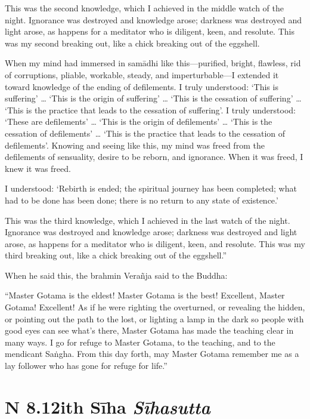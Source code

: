\documentclass[12pt,openany]{book}%
\newcommand*{\suttatitleacronym}[1]{\smaller[2]{#1}\vspace*{.3em}}
\newcommand*{\suttatitletranslation}[1]{\linebreak{#1}}
\newcommand*{\suttatitleroot}[1]{\linebreak\smaller[2]\itshape{#1}}
\newcommand*{\tocacronym}[1]{\hspace*{-3.3em}{#1}\quad}
\newcommand*{\toctranslation}[1]{#1}
\newcommand*{\tocroot}[1]{(\textit{#1})}
\begin{document}
This was the second knowledge, which I achieved in the middle watch of the night. Ignorance was destroyed and knowledge arose; darkness was destroyed and light arose, as happens for a meditator who is diligent, keen, and resolute. This was my second breaking out, like a chick breaking out of the eggshell. 

When my mind had immersed in \textsanskrit{samādhi} like this—purified, bright, flawless, rid of corruptions, pliable, workable, steady, and imperturbable—I extended it toward knowledge of the ending of defilements. I truly understood: ‘This is suffering’ … ‘This is the origin of suffering’ … ‘This is the cessation of suffering’ … ‘This is the practice that leads to the cessation of suffering’. I truly understood: ‘These are defilements’ … ‘This is the origin of defilements’ … ‘This is the cessation of defilements’ … ‘This is the practice that leads to the cessation of defilements’. Knowing and seeing like this, my mind was freed from the defilements of sensuality, desire to be reborn, and ignorance. When it was freed, I knew it was freed. 

I understood: ‘Rebirth is ended; the spiritual journey has been completed; what had to be done has been done; there is no return to any state of existence.’ 

This was the third knowledge, which I achieved in the last watch of the night. Ignorance was destroyed and knowledge arose; darkness was destroyed and light arose, as happens for a meditator who is diligent, keen, and resolute. This was my third breaking out, like a chick breaking out of the eggshell.” 

When he said this, the brahmin \textsanskrit{Verañja} said to the Buddha: 

“Master Gotama is the eldest! Master Gotama is the best! Excellent, Master Gotama! Excellent! As if he were righting the overturned, or revealing the hidden, or pointing out the path to the lost, or lighting a lamp in the dark so people with good eyes can see what’s there, Master Gotama has made the teaching clear in many ways. I go for refuge to Master Gotama, to the teaching, and to the mendicant \textsanskrit{Saṅgha}. From this day forth, may Master Gotama remember me as a lay follower who has gone for refuge for life.” 

%
\section*{{\suttatitleacronym AN 8.12}{\suttatitletranslation With Sīha }{\suttatitleroot Sīhasutta}}
\addcontentsline{toc}{section}{\tocacronym{AN 8.12} \toctranslation{With Sīha } \tocroot{Sīhasutta}}
\end{document}
